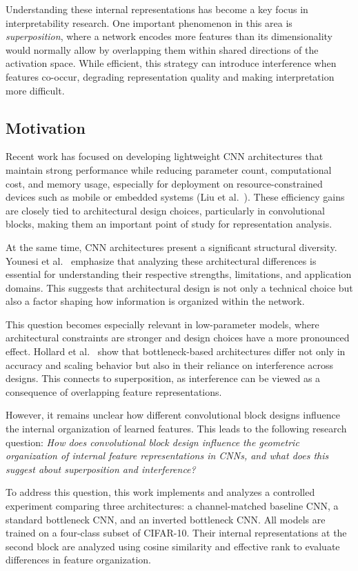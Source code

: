\documentclass[12pt,a4paper]{report}
\begin{document}
Understanding these internal representations has become a key focus in interpretability research. One important phenomenon in this area is \textit{superposition}, where a network encodes more features than its dimensionality would normally allow by overlapping them within shared directions of the activation space. While efficient, this strategy can introduce interference when features co-occur, degrading representation quality and making interpretation more difficult.

\subsection{Motivation}
Recent work has focused on developing lightweight CNN architectures that maintain strong performance while reducing parameter count, computational cost, and memory usage, especially for deployment on resource-constrained devices such as mobile or embedded systems (Liu et al.~\cite{liu2024}). These efficiency gains are closely tied to architectural design choices, particularly in convolutional blocks, making them an important point of study for representation analysis.

At the same time, CNN architectures present a significant structural diversity. Younesi et al.~\cite{younesi2024} emphasize that analyzing these architectural differences is essential for understanding their respective strengths, limitations, and application domains. This suggests that architectural design is not only a technical choice but also a factor shaping how information is organized within the network.

This question becomes especially relevant in low-parameter models, where architectural constraints are stronger and design choices have a more pronounced effect. Hollard et al.~\cite{hollard2025} show that bottleneck-based architectures differ not only in accuracy and scaling behavior but also in their reliance on interference across designs. This connects to superposition, as interference can be viewed as a consequence of overlapping feature representations.

However, it remains unclear how different convolutional block designs influence the internal organization of learned features. This leads to the following research question: \textit{How does convolutional block design influence the geometric organization of internal feature representations in CNNs, and what does this suggest about superposition and interference?}

To address this question, this work implements and analyzes a controlled experiment comparing three architectures: a channel-matched baseline CNN, a standard bottleneck CNN, and an inverted bottleneck CNN. All models are trained on a four-class subset of CIFAR-10. Their internal representations at the second block are analyzed using cosine similarity and effective rank to evaluate differences in feature organization.
\end{document}
